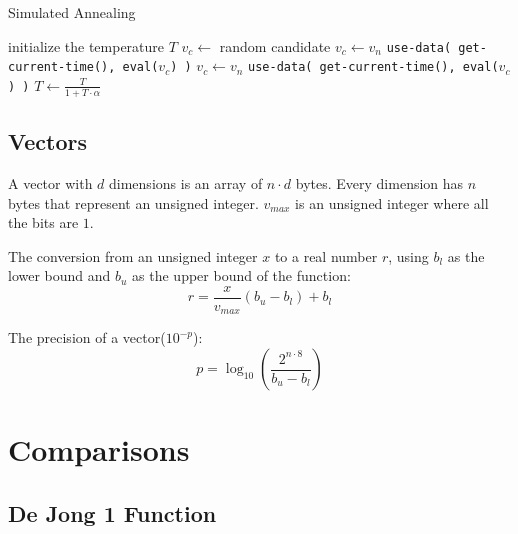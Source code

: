 \documentclass{article}
\begin{document}
\begin{algorithm}
\caption{Simulated Annealing}\label{alg:cap}
\begin{algorithmic}
    \State initialize the temperature $T$
    \State $v_c \gets $ random candidate
    \Repeat
                \State $v_c \gets v_n$
                \State \texttt{use-data( get-current-time(), eval(}$v_c$\texttt{) )}
            \Else
                \If{ random[0,1) $ < e^{-\frac{|eval(v_n)-eval(v_c)|}{T}}$} 
                    \State $v_c \gets v_n$
                    \State \texttt{use-data( get-current-time(), eval(}$v_c$\texttt{) )}
                \EndIf 
            \EndIf 
        \EndFor
        \State $T \gets \frac{T}{1+T \cdot \alpha}$
\EndProcedure
\end{algorithmic}
\end{algorithm}

\subsection{Vectors}
A vector with $d$ dimensions is an array of $n \cdot d$ bytes. Every dimension has $n$ bytes that represent an unsigned integer. $v_{max}$ is an unsigned integer where all the bits are $1$.

The conversion from an unsigned integer $x$ to a real number $r$, using $b_l$ as the lower bound and $b_u$ as the upper bound of the function: $$r = \frac{x}{v_{max}}(b_u - b_l)+b_l$$

The precision of a vector($10^{-p}$): $$p = \log_{10}{\left( \frac{ 2^{n \cdot 8}}{b_u- b_l} \right)}$$

\newpage


\section{Comparisons}
\subsection{De Jong 1 Function}
\end{document}
